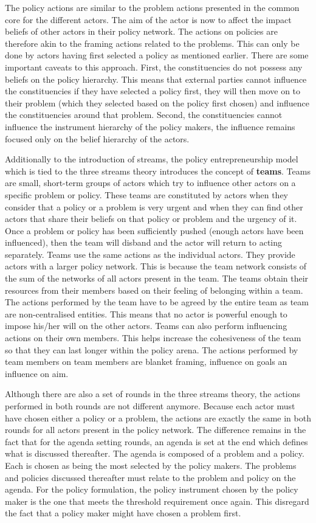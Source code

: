 \documentclass{article}
\begin{document}
The policy actions are similar to the problem actions presented in the common core for the different actors. The aim of the actor is now to affect the impact beliefs of other actors in their policy network. The actions on policies are therefore akin to the framing actions related to the problems. This can only be done by actors having first selected a policy as mentioned earlier. There are some important caveats to this approach. First, the constituencies do not possess any beliefs on the policy hierarchy. This means that external parties cannot influence the constituencies if they have selected a policy first, they will then move on to their problem (which they selected based on the policy first chosen) and influence the constituencies around that problem. Second, the constituencies cannot influence the instrument hierarchy of the policy makers, the influence remains focused only on the belief hierarchy of the actors.

Additionally to the introduction of streams, the policy entrepreneurship model which is tied to the three streams theory introduces the concept of {\bfseries teams}. Teams are small, short-term groups of actors which try to influence other actors on a specific problem or policy. These teams are constituted by actors when they consider that a policy or a problem is very urgent and when they can find other actors that share their beliefs on that policy or problem and the urgency of it. Once a problem or policy has been sufficiently pushed (enough actors have been influenced), then the team will disband and the actor will return to acting separately. Teams use the same actions as the individual actors. They provide actors with a larger policy network. This is because the team network consists of the sum of the networks of all actors present in the team. The teams obtain their resources from their members based on their feeling of belonging within a team. The actions performed by the team have to be agreed by the entire team as team are non-centralised entities. This means that no actor is powerful enough to impose his/her will on the other actors. Teams can also perform influencing actions on their own members. This helps increase the cohesiveness of the team so that they can last longer within the policy arena. The actions performed by team members on team members are blanket framing, influence on goals an influence on aim.

Although there are also a set of rounds in the three streams theory, the actions performed in both rounds are not different anymore. Because each actor must have chosen either a policy or a problem, the actions are exactly the same in both rounds for all actors present in the policy network. The difference remains in the fact that for the agenda setting rounds, an agenda is set at the end which defines what is discussed thereafter. The agenda is composed of a problem and a policy. Each is chosen as being the most selected by the policy makers. The problems and policies discussed thereafter must relate to the problem and policy on the agenda. For the policy formulation, the policy instrument chosen by the policy maker is the one that meets the threshold requirement once again. This disregard the fact that a policy maker might have chosen a problem first.
\end{document}
